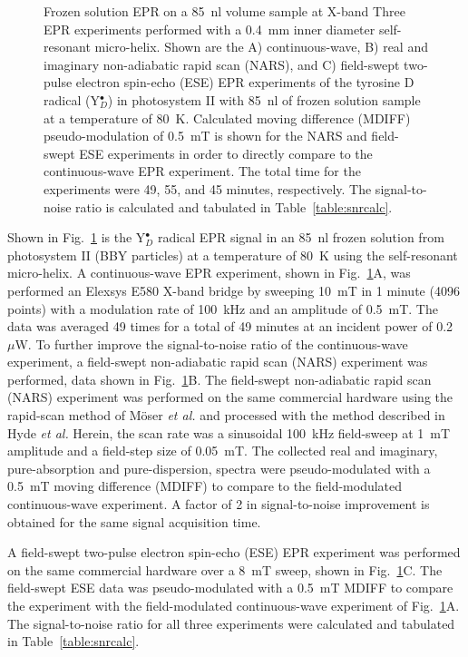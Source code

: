 \begin{figure}[htbp]
\caption[Frozen solution EPR on a 85~nl volume sample at X-band.]{Frozen solution EPR on a 85~nl volume sample at X-band Three EPR experiments performed with a 0.4~mm inner diameter self-resonant micro-helix. Shown are the A) continuous-wave, B) real and imaginary non-adiabatic rapid scan (NARS), and C) field-swept two-pulse electron spin-echo (ESE) EPR experiments of the tyrosine D radical (Y$_D^\bullet$) in photosystem II with 85~nl of frozen solution sample at a temperature of 80~K. Calculated moving difference (MDIFF) pseudo-modulation of 0.5~mT is shown for the NARS and field-swept ESE experiments in order to directly compare to the continuous-wave EPR experiment. The total time for the experiments were 49, 55, and 45 minutes, respectively. The signal-to-noise ratio is calculated and tabulated in Table~\ref{table:snrcalc}.}
\label{fig:BBYPSII}
\end{figure}

Shown in Fig.~\ref{fig:BBYPSII} is the Y$_D^\bullet$ radical EPR signal in an 85~nl frozen solution from photosystem II (BBY particles) at a temperature of 80~K using the self-resonant micro-helix. A continuous-wave EPR experiment, shown in Fig.~\ref{fig:BBYPSII}A, was performed an Elexsys E580 X-band bridge by sweeping 10~mT in 1 minute (4096 points) with a modulation rate of 100~kHz and an amplitude of 0.5~mT. The data was averaged 49 times for a total of 49 minutes at an incident power of 0.2~$\mu$W. To further improve the signal-to-noise ratio of the continuous-wave experiment, a field-swept non-adiabatic rapid scan (NARS) experiment was performed, data shown in Fig.~\ref{fig:BBYPSII}B. The field-swept non-adiabatic rapid scan (NARS) experiment was performed on the same commercial hardware using the rapid-scan method of M\"{o}ser {\em et al.}\cite{MOSER2017} and processed with the method described in Hyde {\em et al.}\cite{Hyde2013MDIFF} Herein, the scan rate was a sinusoidal 100~kHz field-sweep at 1~mT amplitude and a field-step size of 0.05~mT. The collected real and imaginary, pure-absorption and pure-dispersion, spectra were pseudo-modulated with a 0.5~mT moving difference (MDIFF)\cite{Hyde2013MDIFF} to compare to the field-modulated continuous-wave experiment. A factor of 2 in signal-to-noise improvement is obtained for the same signal acquisition time. 

A field-swept two-pulse electron spin-echo (ESE) EPR experiment was performed on the same commercial hardware over a 8~mT sweep, shown in Fig.~\ref{fig:BBYPSII}C. The field-swept ESE data was pseudo-modulated with a 0.5~mT MDIFF to compare the experiment with the field-modulated continuous-wave experiment of Fig.~\ref{fig:BBYPSII}A. The signal-to-noise ratio for all three experiments were calculated and tabulated in Table~\ref{table:snrcalc}. 

